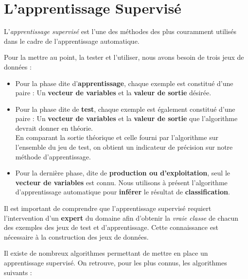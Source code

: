\section{L'apprentissage Supervisé}

L'\textit{apprentissage supervisé} est l'une des méthodes des plus couramment utilisés dans le cadre de l'apprentissage automatique.

Pour la mettre au point, la tester et l'utiliser, nous avons besoin de trois jeux de données :

\begin{itemize}
	\item Pour la phase dite d'\textbf{apprentissage}, chaque exemple est constitué d'une paire : Un \textbf{vecteur de variables} et la \textbf{valeur de sortie} désirée.\\
	
	\item Pour la phase dite de \textbf{test}, chaque exemple est également constitué d'une paire : Un \textbf{vecteur de variables} et la \textbf{valeur de sortie} que l'algorithme devrait donner en théorie.\\ 
	En comparant la sortie théorique et celle fourni par l'algorithme sur l'ensemble du jeu de test, on obtient un indicateur de précision sur notre méthode d'apprentissage.\\
	
	\item Pour la dernière phase, dite de \textbf{production ou d'exploitation}, seul le \textbf{vecteur de variables} est connu. Nous utilisons à présent l'algorithme d'apprentissage automatique pour \textbf{inférer} le résultat de \textbf{classification}.

\end{itemize}
\vspace{3mm}

Il est important de comprendre que l'apprentissage supervisé requiert l'intervention d'un \textbf{expert} du domaine afin d'obtenir la \textit{vraie classe} de chacun des exemples des jeux de test et d'apprentissage. Cette connaissance est nécessaire à la construction des jeux de données.

\vspace{3mm}

Il existe de nombreux algorithmes permettant de mettre en place un apprentissage supervisé. On retrouve, pour les plus connus, les algorithmes suivants : 

